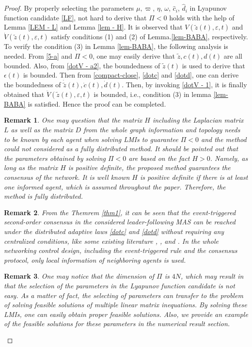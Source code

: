 \documentclass[review]{elsarticle}
\newtheorem{rmk}{Remark}
\begin{document}
\begin{proof}
	By properly selecting the parameters $\mu,\varpi$, $\eta$, $\omega$, $\hat{c}_i$, $\hat{d}_i$ in Lyapunov function candidate \eqref{LF}, not hard to derive that $\Pi<0$ holds with the help of Lemma \ref{LEM - L} and Lemma \ref{lem - H}.  It is observed that $V(\tilde z(t) ,\varepsilon, t) $ and $\dot V(\tilde z(t) ,\varepsilon, t) $ satisfy conditions (1) and (2) of Lemma.\ref{lem-BABA}, respectively. To verify the condition (3) in Lemma \ref{lem-BABA}, the following analysis is needed. From \eqref{5-a} and $\Pi<0$, one may easily derive that $\tilde{z}, c(t),d(t)$ are all bounded. 
	Also, from \eqref{dotV - a2}, the boundedness of $\tilde{z}(t)$ is used to derive that $\epsilon(t)$ is bounded.
	Then from \eqref{compact-close}, \eqref{dotc} and \eqref{dotd}, one can derive the boundedness of $\dot {\tilde{z}} (t),\dot c(t),\dot d(t)$. 
	Then, by invoking \eqref{dotV - 1}, it is finally obtained that $\ddot V(\tilde z(t) ,\varepsilon, t)$ is bounded, i.e., condition (3) in lemma \ref{lem-BABA} is satisfied. Hence the proof can be completed. 
	\begin{rmk}
		One may question that the matrix $H$ including the Laplacian matrix $L$ as well as the matrix $D$ from the whole graph information and topology needs to be known by each agent when solving LMIs to guarantee $\Pi <0$ and the method could not considered as a fully distributed method. It should be pointed out that the parameters obtained by solving $\Pi<0$ are based on the fact $H>0$. Namely, as long as the matrix $H$ is positive definite, the proposed method guarantees the consensus of the network. It is well known $H$ is positive definite if there is at least one informed agent, which is assumed throughout the paper. Therefore, the method is fully distributed.
	\end{rmk}
	\begin{rmk}
		From the Themrem \ref{thm1}, it can be seen that the event-triggered second-order consensus in the considered leader-following MAS can be reached under the distributed adaptive laws \eqref{dotc} and \eqref{dotd} without requiring any centralized conditions, like some existing literature \cite{Zhao2017Event}, \cite{Li2015Event}, \cite{Guo2014A} and \cite{Zhu2014Event}. In the whole networking control design, including the event-triggered rule and the consensus protocol, only local information of neighboring agents is used.  
	\end{rmk}
	\begin{rmk}
		One may notice that the dimension of $\Pi$ is $4N$, which may result in that the selection of the parameters in the Lyapunov function candidate is not easy. As a matter of fact, the selecting of parameters can transfer to the problem of solving feasible solutions of multiple linear matrix inequations. By solving these LMIs, one can easily obtain proper feasible solutions. Also, we provide an example of the feasible solutions for these parameters in the numerical result section. 
	\end{rmk}
	
\end{proof}
\end{document}
